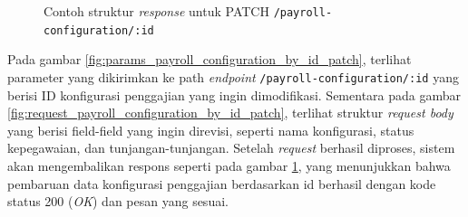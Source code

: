 \begin{figure}
    \centering
    \caption{Contoh struktur \textit{response} untuk PATCH \texttt{/payroll-configuration/{:id}}}
    \label{fig:response_payroll_configuration_by_id_patch}
\end{figure}

Pada gambar \ref{fig:params_payroll_configuration_by_id_patch}, terlihat parameter yang dikirimkan ke path \textit{endpoint} \texttt{/payroll-configuration/{:id}} yang berisi ID konfigurasi penggajian yang ingin dimodifikasi. Sementara pada gambar \ref{fig:request_payroll_configuration_by_id_patch}, terlihat struktur \textit{request body} yang berisi field-field yang ingin direvisi, seperti nama konfigurasi, status kepegawaian, dan tunjangan-tunjangan. Setelah \textit{request} berhasil diproses, sistem akan mengembalikan respons seperti pada gambar \ref{fig:response_payroll_configuration_by_id_patch}, yang menunjukkan bahwa pembaruan data konfigurasi penggajian berdasarkan id berhasil dengan kode status 200 (\textit{OK}) dan pesan yang sesuai.

